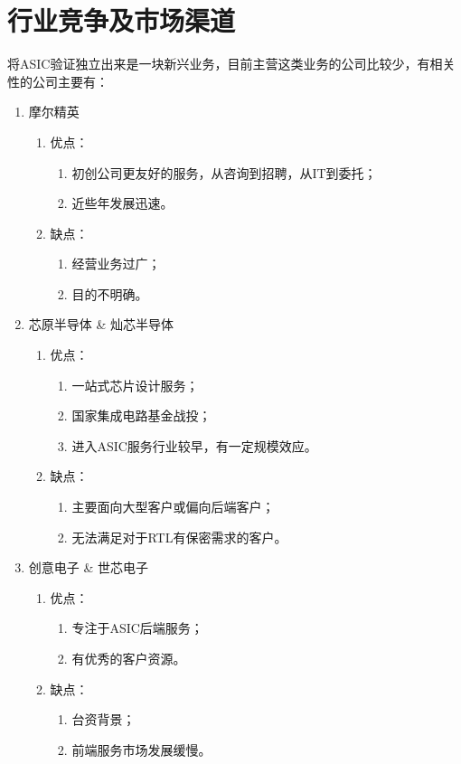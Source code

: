 \documentclass[a4paper,11pt]{article}
\begin{document}
\section{行业竞争及市场渠道}
将ASIC验证独立出来是一块新兴业务，目前主营这类业务的公司比较少，有相关性的公司主要有：
\begin{enumerate}
\item 摩尔精英
  \begin{enumerate}
  \item 优点：
    \begin{enumerate}
    \item 初创公司更友好的服务，从咨询到招聘，从IT到委托；
    \item 近些年发展迅速。
    \end{enumerate}
  \item 缺点：
    \begin{enumerate}
    \item 经营业务过广；
    \item 目的不明确。
    \end{enumerate}
  \end{enumerate}
\item 芯原半导体 \& 灿芯半导体
  \begin{enumerate}
  \item 优点：
    \begin{enumerate}
    \item 一站式芯片设计服务；
    \item 国家集成电路基金战投；
    \item 进入ASIC服务行业较早，有一定规模效应。
    \end{enumerate}
  \item 缺点：
    \begin{enumerate}
    \item 主要面向大型客户或偏向后端客户；
    \item 无法满足对于RTL有保密需求的客户。
    \end{enumerate}
  \end{enumerate}
\item 创意电子 \& 世芯电子
  \begin{enumerate}
  \item 优点：
    \begin{enumerate}
    \item 专注于ASIC后端服务；
    \item 有优秀的客户资源。
    \end{enumerate}
  \item 缺点：
    \begin{enumerate}
    \item 台资背景；
    \item 前端服务市场发展缓慢。
    \end{enumerate}
  \end{enumerate}
\end{enumerate}
\end{document}
